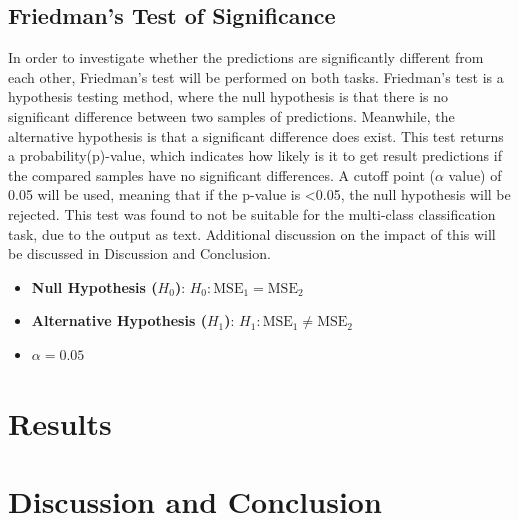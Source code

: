 \documentclass[10.7pt, onecolumn]{article}
\begin{document}
\subsection{Friedman's Test of Significance}
In order to investigate whether the predictions are significantly different from each other, Friedman's test will be performed on both tasks. Friedman's test is a hypothesis testing method, where the null hypothesis is that there is no significant difference between two samples of predictions\cite{HOFFMAN2015421}. Meanwhile, the alternative hypothesis is that a significant difference does exist. This test returns a probability(p)-value, which indicates how likely is it to get result predictions if the compared samples have no significant differences. A cutoff point ($\alpha$ value) of 0.05 will be used, meaning that if the p-value is <0.05, the null hypothesis will be rejected. This test was found to not be suitable for the multi-class classification task, due to the output as text. Additional discussion on the impact of this will be discussed in Discussion and Conclusion.

\begin{itemize}
  \item \textbf{Null Hypothesis (\(H_0\))}: \(H_0: \text{MSE}_1 = \text{MSE}_2\)
  \item \textbf{Alternative Hypothesis (\(H_1\))}: \(H_1: \text{MSE}_1 \neq \text{MSE}_2\)
  \item \( \alpha = 0.05 \)
\end{itemize}
\section{Results}\label{results}

\section{Discussion and Conclusion}\label{discussion and conclusion}

\end{document}
